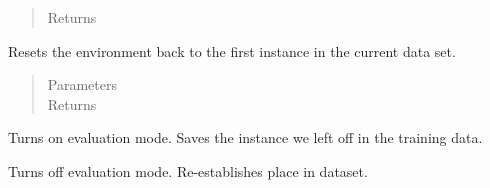 \documentclass[letterpaper,10pt,english]{sphinxmanual}
\begin{document}
\begin{fulllineitems}
\begin{fulllineitems}
\begin{quote}
\begin{description}
\item[{Returns}] \leavevmode


\end{description}\end{quote}

\end{fulllineitems}


\begin{fulllineitems}
\label{\detokenize{eLCS:eLCS.OfflineEnvironment.OfflineEnvironment.resetDataRef}}
Resets the environment back to the first instance in the current data set.
\begin{quote}\begin{description}
\item[{Parameters}] \leavevmode
{} \textendash{} 

\item[{Returns}] \leavevmode


\end{description}\end{quote}

\end{fulllineitems}


\begin{fulllineitems}
\label{\detokenize{eLCS:eLCS.OfflineEnvironment.OfflineEnvironment.startEvaluationMode}}
Turns on evaluation mode.  Saves the instance we left off in the training data.

\end{fulllineitems}


\begin{fulllineitems}
\label{\detokenize{eLCS:eLCS.OfflineEnvironment.OfflineEnvironment.stopEvaluationMode}}
Turns off evaluation mode.  Re-establishes place in dataset.

\end{fulllineitems}


\end{fulllineitems}
\end{document}
